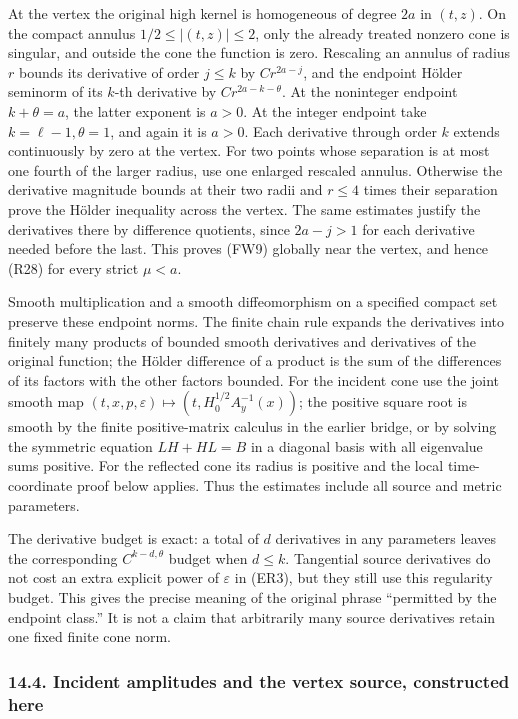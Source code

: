 \documentclass[
  11pt,
]{article}
\begin{document}
At the vertex the original high kernel is homogeneous of degree \(2a\)
in \((t,z)\). On the compact annulus \(1/2\leq|(t,z)|\leq2\), only the
already treated nonzero cone is singular, and outside the cone the
function is zero. Rescaling an annulus of radius \(r\) bounds its
derivative of order \(j\leq k\) by \(Cr^{2a-j}\), and the endpoint
Hölder seminorm of its \(k\)-th derivative by \(Cr^{2a-k-\theta}\). At
the noninteger endpoint \(k+\theta=a\), the latter exponent is \(a>0\).
At the integer endpoint take \(k=\ell-1,\theta=1\), and again it is
\(a>0\). Each derivative through order \(k\) extends continuously by
zero at the vertex. For two points whose separation is at most one
fourth of the larger radius, use one enlarged rescaled annulus.
Otherwise the derivative magnitude bounds at their two radii and
\(r\leq4\) times their separation prove the Hölder inequality across the
vertex. The same estimates justify the derivatives there by difference
quotients, since \(2a-j>1\) for each derivative needed before the last.
This proves (FW9) globally near the vertex, and hence (R28) for every
strict \(\mu<a\).

Smooth multiplication and a smooth diffeomorphism on a specified compact
set preserve these endpoint norms. The finite chain rule expands the
derivatives into finitely many products of bounded smooth derivatives
and derivatives of the original function; the Hölder difference of a
product is the sum of the differences of its factors with the other
factors bounded. For the incident cone use the joint smooth map
\((t,x,p,\varepsilon)\mapsto(t,H_0^{1/2}A_y^{-1}(x))\); the positive
square root is smooth by the finite positive-matrix calculus in the
earlier bridge, or by solving the symmetric equation \(LH+HL=B\) in a
diagonal basis with all eigenvalue sums positive. For the reflected cone
its radius is positive and the local time-coordinate proof below
applies. Thus the estimates include all source and metric parameters.

The derivative budget is exact: a total of \(d\) derivatives in any
parameters leaves the corresponding \(C^{k-d,\theta}\) budget when
\(d\leq k\). Tangential source derivatives do not cost an extra explicit
power of \(\varepsilon\) in (ER3), but they still use this regularity
budget. This gives the precise meaning of the original phrase
``permitted by the endpoint class.'' It is not a claim that arbitrarily
many source derivatives retain one fixed finite cone norm.

\subsubsection{14.4. Incident amplitudes and the vertex source,
constructed
here}\label{incident-amplitudes-and-the-vertex-source-constructed-here}
\end{document}
